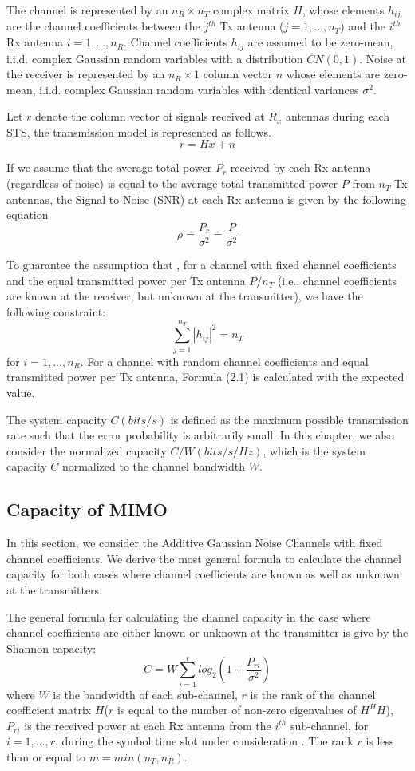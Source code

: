 The channel is represented by an $n_{R}\times n_{T}$ complex matrix
$H$, whose elements $h_{ij}$ are the channel coefficients between
the $j^{th}$ Tx antenna ($j=1,...,n_{T}$) and the $i^{th}$ Rx
antenna $i=1,...,n_{R}$. Channel coefficients $h_{ij}$ are assumed
to be zero-mean, i.i.d. complex Gaussian random variables with a
distribution $CN(0,1)$. Noise at the receiver is represented by an
$n_{R} \times 1$ column vector $n$ whose elements are zero-mean,
i.i.d. complex Gaussian random variables with identical variances
$\sigma^{2}$.

Let $r$ denote the column vector of signals received at $R_{x}$
antennas during each STS, the transmission model is represented as
follows.
\[ r = Hx + n \]

If we assume that the average total power $P_{r}$ received by each
Rx antenna (regardless of noise) is equal to the average total
transmitted power $P$ from $n_{T}$ Tx antennas, the Signal-to-Noise
(SNR) at each Rx antenna is given by the following equation
\[\rho=\frac{P_{r}}{\sigma^{2}}=\frac{P}{\sigma^{2}}\]

To guarantee the assumption that , for a channel with fixed channel
coefficients and the equal transmitted power per Tx antenna
$P/n_{T}$ (i.e., channel coefficients are known at the receiver, but
unknown at the transmitter), we have the following constraint:
\begin{equation}
 \sum_{j=1}^{n_{T}}|h_{ij}|^{2}=n_{T}
\end{equation}
for $i=1,...,n_{R}$. For a channel with random channel coefficients
and equal transmitted power per Tx antenna, Formula (2.1) is
calculated with the expected value.

The system capacity $C(bits/s)$ is defined as the maximum possible
transmission rate such that the error probability is arbitrarily
small. In this chapter, we also consider the normalized capacity
$C/W(bits/s/Hz)$, which is the system capacity $C$ normalized to the
channel bandwidth $W$.

\subsection{Capacity of MIMO}
In this section, we consider the Additive Gaussian Noise Channels
with fixed channel coefficients. We derive the most general formula
to calculate the channel capacity for both cases where channel
coefficients are known as well as unknown at the transmitters.

The general formula for calculating the channel capacity in the case
where channel coefficients are either known or unknown at the
transmitter is give by the Shannon capacity:
\begin{equation}
 C=W\sum_{i=1}^{r}log_{2}(1+\frac{P_{ri}}{\sigma^{2}})
\end{equation}
where $W$ is the bandwidth of each sub-channel, $r$ is the rank of
the channel coefficient matrix $H$($r$ is equal to the number of
non-zero eigenvalues of $H^{H}H$), $P_{ri}$ is the received power at
each Rx antenna from the $i^{th}$ sub-channel, for $i=1,...,r$,
during the symbol time slot under consideration . The rank $r$ is
less than or equal to $m=min(n_{T},n_{R})$.

